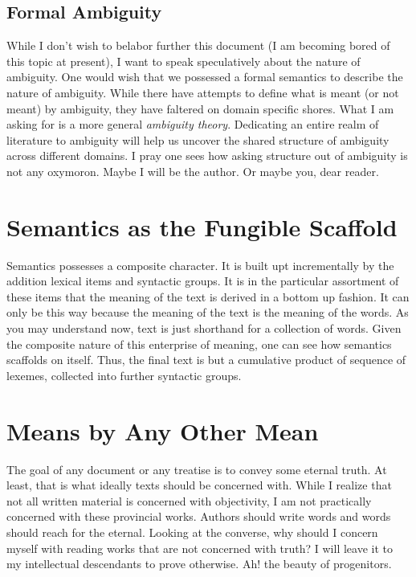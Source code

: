 \documentclass[12pt]{article}
\begin{document}
\subsection{Formal Ambiguity}
While I don't wish to belabor further this document (I am becoming bored of this
topic at present), I want to speak speculatively about the nature of ambiguity.
One would wish that we possessed a formal semantics to describe the nature of
ambiguity. While there have attempts to define what is meant (or not meant) by
ambiguity, they have faltered on domain specific shores. What I am asking for is
a more general \textit{ambiguity theory}. Dedicating an entire realm of
literature to ambiguity will help us uncover the shared structure of ambiguity
across different domains. I pray one sees how asking structure out of ambiguity
is not any oxymoron. Maybe I will be the author. Or maybe you, dear reader.

\section{Semantics as the Fungible Scaffold}
Semantics possesses a composite character. It is built upt incrementally by the
addition lexical items and syntactic groups. It is in the particular assortment
of these items that the meaning of the text is derived in a bottom up fashion.
It can only be this way because the meaning of the text is the meaning of the
words. As you may understand now, text is just shorthand for a collection of
words. Given the composite nature of this enterprise of meaning, one can see how
semantics scaffolds on itself. Thus, the final text is but a cumulative product
of sequence of lexemes, collected into further syntactic groups.

\section{Means by Any Other Mean}
The goal of any document or any treatise is to convey some eternal truth. At
least, that is what ideally texts should be concerned with. While I realize that
not all written material is concerned with objectivity, I am not practically
concerned with these provincial works. Authors should write words and words
should reach for the eternal. Looking at the converse, why should I concern
myself with reading works that are not concerned with truth? I will leave it to
my intellectual descendants to prove otherwise. Ah! the beauty of progenitors.
\end{document}
